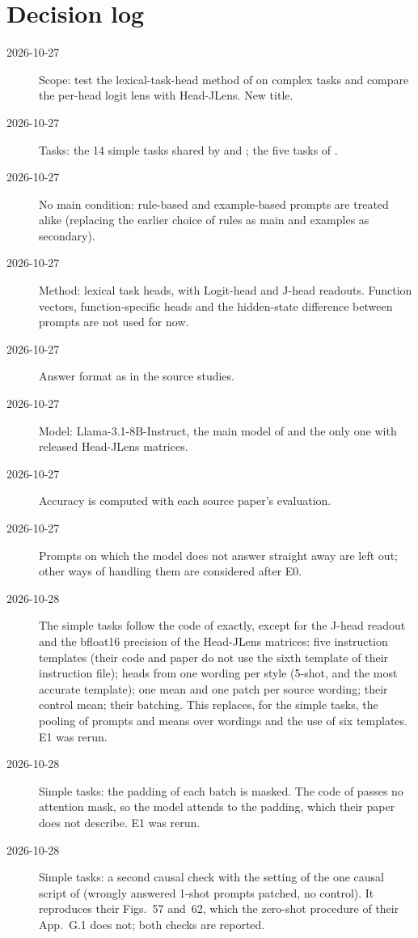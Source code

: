 \documentclass[11pt,a4paper]{article}
\begin{document}
\section*{Decision log}\label{app:decisions}
\begin{description}
\item[2026-10-27] Scope: test the lexical-task-head method of \citet{yang2026shared} on complex tasks and compare the per-head logit lens with Head-JLens. New title.
\item[2026-10-27] Tasks: the 14 simple tasks shared by \citet{yang2026shared} and \citet{davidson2025different}; the five tasks of \citet{fu2026rules}.
\item[2026-10-27] No main condition: rule-based and example-based prompts are treated alike (replacing the earlier choice of rules as main and examples as secondary).
\item[2026-10-27] Method: lexical task heads, with Logit-head and J-head readouts. Function vectors, function-specific heads and the hidden-state difference between prompts are not used for now.
\item[2026-10-27] Answer format as in the source studies.
\item[2026-10-27] Model: Llama-3.1-8B-Instruct, the main model of \citet{yang2026shared} and the only one with released Head-JLens matrices.
\item[2026-10-27] Accuracy is computed with each source paper's evaluation.
\item[2026-10-27] Prompts on which the model does not answer straight away are left out; other ways of handling them are considered after E0.
\item[2026-10-28] The simple tasks follow the code of \citet{yang2026shared} exactly, except for the J-head readout and the bfloat16 precision of the Head-JLens matrices: five instruction templates (their code and paper do not use the sixth template of their instruction file); heads from one wording per style (5-shot, and the most accurate template); one mean and one patch per source wording; their control mean; their batching. This replaces, for the simple tasks, the pooling of prompts and means over wordings and the use of six templates. E1 was rerun.
\item[2026-10-28] Simple tasks: the padding of each batch is masked. The code of \citet{yang2026shared} passes no attention mask, so the model attends to the padding, which their paper does not describe. E1 was rerun.
\item[2026-10-28] Simple tasks: a second causal check with the setting of the one causal script of \citet{yang2026shared} (wrongly answered 1-shot prompts patched, no control). It reproduces their Figs.~57 and~62, which the zero-shot procedure of their App.~G.1 does not; both checks are reported.

\end{description}
\end{document}
